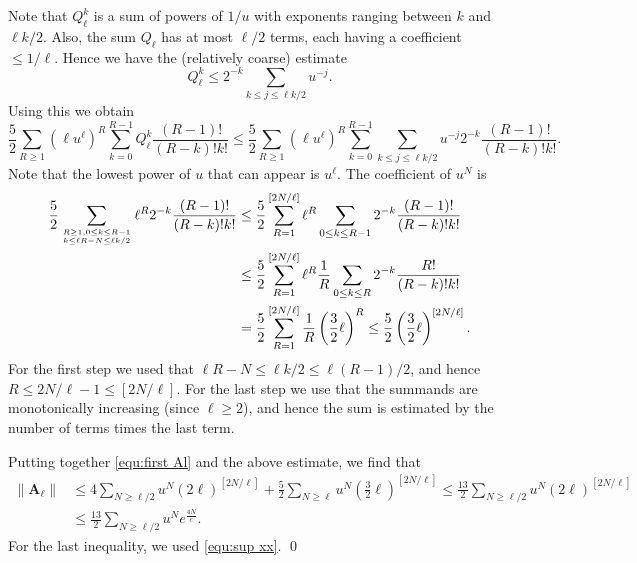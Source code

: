 \documentclass[12pt]{amsart}
\theoremstyle{definition}
\numberwithin{equation}{section}
\newcommand{\bA}{\mathbf{A}}
\theoremstyle{definition} %
\theoremstyle{remark}
\begin{document}
Note that $Q_\ell^k$ is a sum of powers of $1/u$ with exponents ranging between $k$ and $\ell k/2$. Also, the sum $Q_\ell$ has at most $\ell/2$ terms, each having a coefficient $\leq 1/\ell$. Hence we have the (relatively coarse) estimate
\begin{equation}\label{equ:Qell estimate}
  Q_\ell^k\leq  2^{-k} \sum_{k\leq j\leq \ell k/2} u^{-j}.
\end{equation}
Using this we obtain 
\[
\frac52 \sum_{R\geq 1}(\ell u^\ell)^{R} \sum_{k=0}^{R-1} Q_\ell^k \frac{(R-1)!}{(R-k)!k!}
\leq
\frac52 \sum_{R\geq 1}(\ell u^\ell)^{R}
\sum_{k=0}^{R-1}
\sum_{k\leq j\leq \ell k/2} u^{-j} 2^{-k}  \frac{(R-1)!}{(R-k)!k!}.
\]
Note that the lowest power of $u$ that can appear is $u^\ell$.
The coefficient of $u^N$ is 
\begin{align*}
    \frac52 
\sum_{R\geq 1, 0\leq k\leq R-1 \atop  k\leq \ell R-N\leq \ell k /2 }
\ell^R 2^{-k} \frac{(R-1)!}{(R-k)!k!}
&\leq 
\frac52 
\sum_{R=1}^{[2N/\ell]}\ell^R
\sum_{0\leq k\leq R-1}
2^{-k} \frac{(R-1)!}{(R-k)!k!}
\\&\leq
\frac52 
\sum_{R=1}^{[2N/\ell]}\ell^R
\frac{1}{R}
\sum_{0\leq k\leq R}
2^{-k} \frac{R!}{(R-k)!k!}
\\&=
\frac52 
\sum_{R=1}^{[2N/\ell]} \frac{1}{R}\left(\frac32\ell\right)^R
\leq \frac52 \left(\frac32\ell\right)^{[2N/\ell]}.
\end{align*}
For the first step we used that $\ell R - N\leq \ell k/2 \leq \ell(R-1)/2$, and hence $R\leq 2N/\ell -1 \leq [2N/\ell]$.
For the last step we use that the summands are monotonically increasing (since $\ell\geq 2$), and hence the sum is estimated by the number of terms times the last term.

Putting together \eqref{equ:first Al} and the above estimate, we find that 
\begin{align*}
    \|\bA_\ell\| &\leq 
   4 \sum_{N\geq \ell/2} u^N(2\ell)^{[2N/\ell]}
    +
    \frac52 \sum_{N\geq \ell}u^N
    \left(\frac32\ell\right)^{[2N/\ell]} 
    \leq 
    \frac{13}{2}\sum_{N\geq \ell/2}u^N (2\ell)^{[2N/\ell]}
   \\&\leq 
   \frac{13}{2} \sum_{N\geq \ell/2}  u^N
    e^{\frac{4N}e}.
\end{align*}
For the last inequality, we used \eqref{equ:sup xx}.
\hfill\qed
\end{document}
